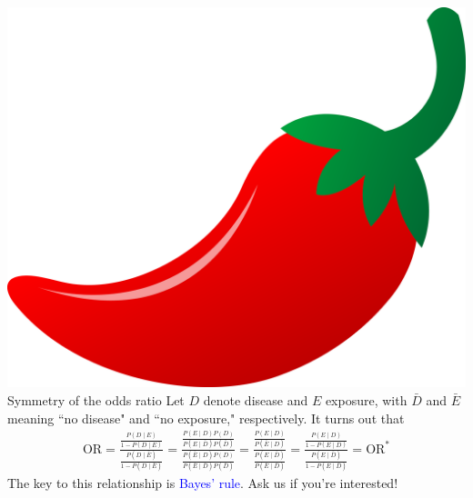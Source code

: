 \documentclass[10pt,t]{beamer}
\begin{document}
\begin{frame}{\includegraphics[scale=0.01]{./figs/chilipepper} Symmetry of the odds ratio}
	Let $D$ denote disease and $E$ exposure, with $\bar{D}$ and $\bar{E}$ meaning ``no disease" and ``no exposure," respectively. It turns out that 
	\begin{align*}
		\text{OR} = \frac{\frac{P(D \mid E)}{1 - P(D \mid  E)}}{\frac{P(D \mid \bar{E})}{1 - P(D \mid \bar{E})}} = \frac{\frac{P(E \mid D)P(D)}{P(E \mid \bar{D})P(\bar{D})}}{\frac{P(\bar{E} \mid D)P(D)}{P(\bar{E} \mid \bar{D})P(\bar{D})}} = \frac{\frac{P(E \mid D)}{P(\bar{E} \mid D)}}{\frac{P(E \mid \bar{D})}{P(\bar{E} \mid \bar{D})}} = \frac{\frac{P(E \mid D)}{1 - P(E \mid D)}}{\frac{P(E\mid \bar{D})}{1 - P(E\mid \bar{D})}} = \text{OR}^*
	\end{align*}
	The key to this relationship is \textcolor{blue}{Bayes' rule}. Ask us if you're interested!
\end{frame}
\end{document}
